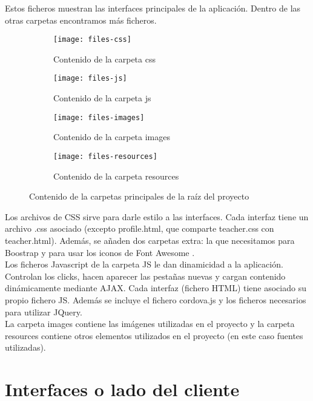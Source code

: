 Estos ficheros muestran las interfaces principales de la aplicación. Dentro de las otras carpetas encontramos más ficheros.

\begin{figure}[h]
\begin{subfigure}[b]{0.5\textwidth}
	\texttt{[image: files-css]}
	\caption{Contenido de la carpeta css}
	\label{fig:files-css}
\end{subfigure}
%
\begin{subfigure}[b]{0.5\textwidth}
	\texttt{[image: files-js]}
	\caption{Contenido de la carpeta js}
	\label{fig:files-js}
\end{subfigure}
%
\begin{subfigure}[b]{0.5\textwidth}
	\texttt{[image: files-images]}
	\caption{Contenido de la carpeta images}
	\label{fig:files-images}
\end{subfigure}
%
\begin{subfigure}[b]{0.5\textwidth}
	\texttt{[image: files-resources]}
	\caption{Contenido de la carpeta resources}
	\label{fig:files-resources}
\end{subfigure}

\caption{Contenido de la carpetas principales de la raíz del proyecto}
\label{fig:files-2}
\end{figure}

Los archivos de CSS sirve para darle estilo a las interfaces. Cada interfaz tiene un archivo .css asociado (excepto profile.html, que comparte teacher.css con teacher.html). Además, se añaden dos carpetas extra: la que necesitamos para Boostrap \hyperref[boostrap]{\cite{boostrap}} y para usar los iconos de Font Awesome \hyperref[fontawesome]{\cite{fontawesome}}.\\

Los ficheros Javascript de la carpeta JS le dan dinamicidad a la aplicación. Controlan los clicks, hacen aparecer las pestañas nuevas y cargan contenido dinámicamente mediante AJAX. Cada interfaz (fichero HTML) tiene asociado su propio fichero JS. Además se incluye el fichero cordova.js y los ficheros necesarios para utilizar JQuery.\\

La carpeta images contiene las imágenes utilizadas en el proyecto y la carpeta resources contiene otros elementos utilizados en el proyecto (en este caso fuentes utilizadas).\\

\section{Interfaces o lado del cliente}
\label{diseno-e-implementacion:interfaces}

